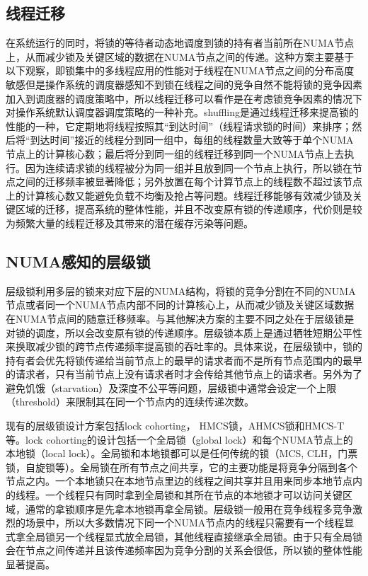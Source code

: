 \subsection{线程迁移}
在系统运行的同时，将锁的等待者动态地调度到锁的持有者当前所在NUMA节点上，从而减少锁及关键区域的数据在NUMA节点之间的传递\cite{sridharan2006thread}\cite{thekkath1994impact}。这种方案主要基于以下观察，即锁集中的多线程应用的性能对于线程在NUMA节点之间的分布高度敏感但是操作系统的调度器感知不到锁在线程之间的竞争自然不能将锁的竞争因素加入到调度器的调度策略中，所以线程迁移可以看作是在考虑锁竞争因素的情况下对操作系统默认调度器调度策略的一种补充。shuffling\cite{pusukuri2014shuffling}是通过线程迁移来提高锁的性能的一种，它定期地将线程按照其“到达时间”（线程请求锁的时间）来排序；然后将“到达时间”接近的线程分到同一组中，每组的线程数量大致等于单个NUMA节点上的计算核心数；最后将分到同一组的线程迁移到同一个NUMA节点上去执行。因为连续请求锁的线程被分为同一组并且放到同一个节点上执行，所以锁在节点之间的迁移频率被显著降低；另外放置在每个计算节点上的线程数不超过该节点上的计算核心数又能避免负载不均衡及抢占等问题。线程迁移能够有效减少锁及关键区域的迁移，提高系统的整体性能，并且不改变原有锁的传递顺序，代价则是较为频繁大量的线程迁移及其带来的潜在缓存污染等问题。

\subsection{NUMA感知的层级锁}
层级锁利用多层的锁来对应下层的NUMA结构，将锁的竞争分割在不同的NUMA节点或者同一个NUMA节点内部不同的计算核心上，从而减少锁及关键区域数据在NUMA节点间的随意迁移频率\cite{dice2012lock}。与其他解决方案的主要不同之处在于层级锁是对锁的调度，所以会改变原有锁的传递顺序。层级锁本质上是通过牺牲短期公平性来换取减少锁的跨节点传递频率提高锁的吞吐率的。具体来说，在层级锁中，锁的持有者会优先将锁传递给当前节点上的最早的请求者而不是所有节点范围内的最早的请求者，只有当前节点上没有请求者时才会传给其他节点上的请求者。另外为了避免饥饿（starvation）及深度不公平等问题，层级锁中通常会设定一个上限（threshold）来限制其在同一个节点内的连续传递次数。

现有的层级锁设计方案包括lock cohorting\cite{dice2012lock}， HMCS锁\cite{chabbi2015high}，AHMCS锁\cite{chabbi2016contention}和HMCS-T\cite{chabbi2017efficient}等。lock cohorting的设计包括一个全局锁（global lock）和每个NUMA节点上的本地锁（local lock）。全局锁和本地锁都可以是任何传统的锁（MCS, CLH，门票锁，自旋锁等）。全局锁在所有节点之间共享，它的主要功能是将竞争分隔到各个节点之内。一个本地锁只在本地节点里边的线程之间共享并且用来同步本地节点内的线程。一个线程只有同时拿到全局锁和其所在节点的本地锁才可以访问关键区域，通常的拿锁顺序是先拿本地锁再拿全局锁。层级锁一般用在竞争线程多竞争激烈的场景中，所以大多数情况下同一个NUMA节点内的线程只需要有一个线程显式拿全局锁另一个线程显式放全局锁，其他线程直接继承全局锁。由于只有全局锁会在节点之间传递并且该传递频率因为竞争分割的关系会很低，所以锁的整体性能显著提高。

